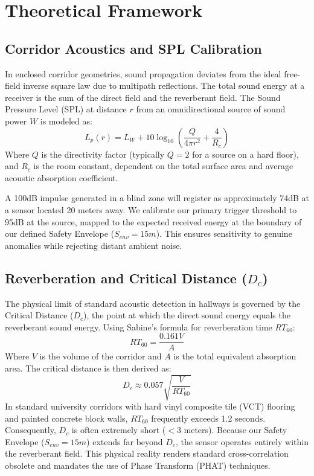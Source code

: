 \documentclass[conference]{IEEEtran}
\begin{document}
\section{Theoretical Framework}

\subsection{Corridor Acoustics and SPL Calibration}
In enclosed corridor geometries, sound propagation deviates from the ideal free-field inverse square law due to multipath reflections. The total sound energy at a receiver is the sum of the direct field and the reverberant field. The Sound Pressure Level (SPL) at distance $r$ from an omnidirectional source of sound power $W$ is modeled as:
\begin{equation}
L_p(r) = L_W + 10 \log_{10}\left(\frac{Q}{4\pi r^2} + \frac{4}{R_c}\right)
\end{equation}
Where $Q$ is the directivity factor (typically $Q=2$ for a source on a hard floor), and $R_c$ is the room constant, dependent on the total surface area and average acoustic absorption coefficient. 

A 100dB impulse generated in a blind zone will register as approximately 74dB at a sensor located 20 meters away. We calibrate our primary trigger threshold to 95dB at the source, mapped to the expected received energy at the boundary of our defined Safety Envelope ($S_{env} = 15m$). This ensures sensitivity to genuine anomalies while rejecting distant ambient noise.

\subsection{Reverberation and Critical Distance ($D_c$)}
The physical limit of standard acoustic detection in hallways is governed by the Critical Distance ($D_c$), the point at which the direct sound energy equals the reverberant sound energy. Using Sabine's formula for reverberation time $RT_{60}$:
\begin{equation}
RT_{60} = \frac{0.161 V}{A}
\end{equation}
Where $V$ is the volume of the corridor and $A$ is the total equivalent absorption area. The critical distance is then derived as:
\begin{equation}
D_c \approx 0.057 \sqrt{\frac{V}{RT_{60}}}
\end{equation}
In standard university corridors with hard vinyl composite tile (VCT) flooring and painted concrete block walls, $RT_{60}$ frequently exceeds 1.2 seconds. Consequently, $D_c$ is often extremely short ($< 3$ meters). Because our Safety Envelope ($S_{env} = 15m$) extends far beyond $D_c$, the sensor operates entirely within the reverberant field. This physical reality renders standard cross-correlation obsolete and mandates the use of Phase Transform (PHAT) techniques.
\end{document}
